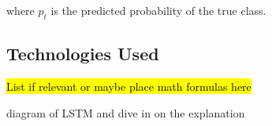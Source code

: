 where $p_t$ is the predicted probability of the true class.






\subsection{Technologies Used}

\hl{List if relevant or maybe place math formulas here}

\begin{comment}
Key libraries used include:
\begin{itemize}
    \item \textbf{pandas} and \textbf{NumPy} for data manipulation and numerical computations;
    \item \textbf{scikit-learn} for classical machine learning models (e.g., Logistic Regression, Random Forest) and preprocessing utilities (e.g., SMOTE, train-test split);
    \item \textbf{xgboost} for gradient boosting classifiers;
    \item \textbf{imbalanced-learn} for handling class imbalance using ensemble methods and synthetic oversampling;
    \item \textbf{TensorFlow} and \textbf{Keras} for building, training, and tuning Long Short-Term Memory (LSTM) networks.
\end{itemize}
\end{comment}


diagram of LSTM and dive in on the explanation 